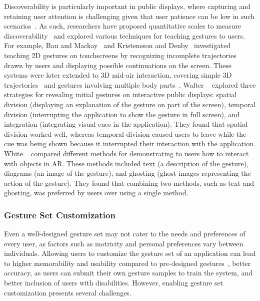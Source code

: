 Discoverability is particularly important in public displays, where capturing and retaining user attention is challenging given that user patience can be low in such scenarios~\cite{Walter:2013}.
%
As such, researchers have proposed quantitative scales to measure discoverability~\cite{Sellier:2024} and explored various techniques for teaching gestures to users.
%
For example, Bau and Mackay~\cite{Bau:2008} and Kristensson and Denby~\cite{Kristensson:2011} investigated teaching 2D gestures on touchscreens by recognizing incomplete trajectories drawn by users and displaying possible continuations on the screen.
%
These systems were later extended to 3D mid-air interaction, covering simple 3D trajectories~\cite{Fennedy:2021} and gestures involving multiple body parts~\cite{Rovelo:2015, Alt:2018}. 
%
Walter \etal~\cite{Walter:2013} explored three strategies for revealing initial gestures on interactive public displays: spatial division (\ie displaying an explanation of the gesture on part of the screen), temporal division (interrupting the application to show the gesture in full screen), and integration (integrating visual cues in the application). They found that spatial division worked well, whereas temporal division caused users to leave while the cue was being shown because it interrupted their interaction with the application.
%
White \etal~\cite{White:2007} compared different methods for demonstrating to users how to interact with objects in AR. These methods included text (\ie a description of the gesture), diagrams (\ie an image of the gesture), and ghosting (\ie ghost images representing the action of the gesture). They found that combining two methods, such as text and ghosting, was preferred by users over using a single method.


\subsubsection{Gesture Set Customization}
Even a well-designed gesture set may not cater to the needs and preferences of every user, as factors such as motricity and personal preferences vary between individuals. Allowing users to customize the gesture set of an application can lead to higher memorability and usability compared to pre-designed gestures~\cite{Oh:2013,Nacenta:2013}, better accuracy, as users can submit their own gesture samples to train the system, and better inclusion of users with disabilities.
% 
However, enabling gesture set customization presents several challenges.


